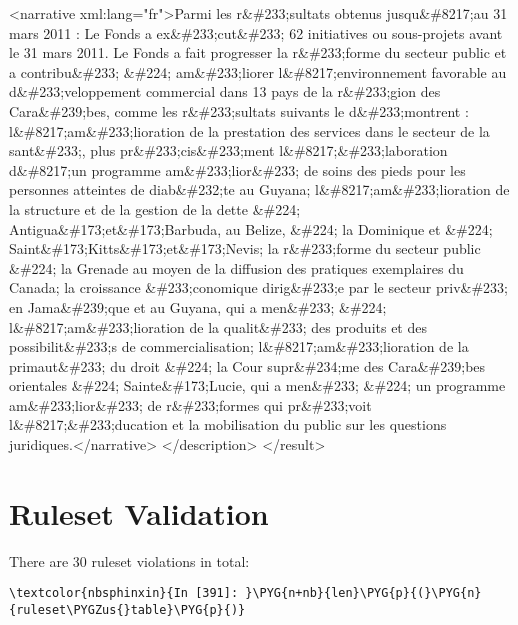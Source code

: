 \documentclass[letterpaper,10pt,english]{sphinxmanual}
\begin{document}
\begin{OriginalVerbatim}[commandchars=\\\{\}]
    <narrative xml:lang="fr">Parmi les r\&\#233;sultats obtenus jusqu\&\#8217;au 31 mars 2011 : Le Fonds a ex\&\#233;cut\&\#233; 62 initiatives ou sous-projets avant le 31 mars 2011. Le Fonds a fait progresser la r\&\#233;forme du secteur public et a contribu\&\#233; \&\#224; am\&\#233;liorer l\&\#8217;environnement favorable au d\&\#233;veloppement commercial dans 13 pays de la r\&\#233;gion des Cara\&\#239;bes, comme les r\&\#233;sultats suivants le d\&\#233;montrent : l\&\#8217;am\&\#233;lioration de la prestation des services dans le secteur de la sant\&\#233;, plus pr\&\#233;cis\&\#233;ment l\&\#8217;\&\#233;laboration d\&\#8217;un programme am\&\#233;lior\&\#233; de soins des pieds pour les personnes atteintes de diab\&\#232;te au Guyana; l\&\#8217;am\&\#233;lioration de la structure et de la gestion de la dette \&\#224; Antigua\&\#173;et\&\#173;Barbuda, au Belize, \&\#224; la Dominique et \&\#224; Saint\&\#173;Kitts\&\#173;et\&\#173;Nevis; la r\&\#233;forme du secteur public \&\#224; la Grenade au moyen de la diffusion des pratiques exemplaires du Canada; la croissance \&\#233;conomique dirig\&\#233;e par le secteur priv\&\#233; en Jama\&\#239;que et au Guyana, qui a men\&\#233; \&\#224; l\&\#8217;am\&\#233;lioration de la qualit\&\#233; des produits et des possibilit\&\#233;s de commercialisation; l\&\#8217;am\&\#233;lioration de la primaut\&\#233; du droit \&\#224; la Cour supr\&\#234;me des Cara\&\#239;bes orientales \&\#224; Sainte\&\#173;Lucie, qui a men\&\#233; \&\#224; un programme am\&\#233;lior\&\#233; de r\&\#233;formes qui pr\&\#233;voit l\&\#8217;\&\#233;ducation et la mobilisation du public sur les questions juridiques.</narrative>
  </description>
</result>

\end{OriginalVerbatim}
\relax

\section{Ruleset Validation}
\label{\detokenize{Global Affairs Canada - Compliance Report:Ruleset-Validation}}
There are 30 ruleset violations in total:

\begin{Verbatim}[commandchars=\\\{\}]
\textcolor{nbsphinxin}{In [391]: }\PYG{n+nb}{len}\PYG{p}{(}\PYG{n}{ruleset\PYGZus{}table}\PYG{p}{)}
\end{Verbatim}
\end{document}
